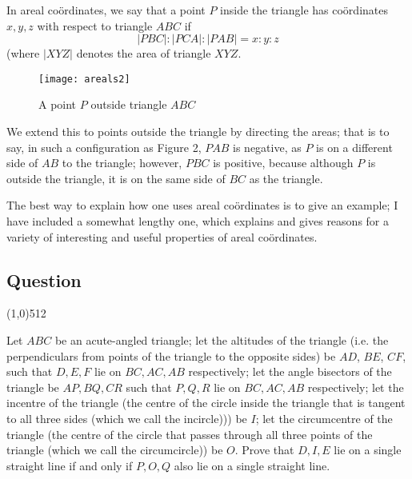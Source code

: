 \documentclass[11pt,a4paper]{report}
\let\origsection\subsection
\renewcommand{\subsection}[1]{\origsection{#1}\vspace{-0.5em}\line(1,0){512}\vspace{-1em}}
\newcounter{count}
\begin{document}
	\begin{multicols}{2}
		
		In areal coördinates, we say that a point \(P\) inside the triangle has coördinates \(x,y,z\) with respect to triangle \(ABC\) if \[|PBC|:|PCA|:|PAB|=x:y:z\]
		(where \(|XYZ|\) denotes the area of triangle \(XYZ\).
		
	\end{multicols}
	
	\setcounter{figure}{-1}
	
	\begin{figure}[h]
		\centering
		\texttt{[image: areals2]}
		\caption{A point \(P\) outside triangle \(ABC\)}
	\end{figure}
	
	\begin{multicols}{2}
		
		We extend this to points outside the triangle by directing the areas; that is to say, in such a configuration as Figure 2, \(PAB\) is negative, as \(P\) is on a different side of \(AB\) to the triangle; however, \(PBC\) is positive, because although \(P\) is outside the triangle, it is on the same side of \(BC\) as the triangle.
		
		The best way to explain how one uses areal coördinates is to give an example; I have included a somewhat lengthy one, which explains and gives reasons for a variety of interesting and useful properties of areal coördinates.
		
	\end{multicols}
	
	\subsection{Question}
	
	\begin{multicols}{2}
		
		Let \(ABC\) be an acute-angled triangle; let the altitudes of the triangle (i.e. the perpendiculars from points of the triangle to the opposite sides) be \(AD\), \(BE\), \(CF\), such that \(D, E, F\) lie on \(BC, AC, AB\) respectively; let the angle bisectors of the triangle be \(AP, BQ, CR\) such that \(P, Q, R\) lie on \(BC, AC, AB\) respectively; let the incentre of the triangle (the centre of the circle inside the triangle that is tangent to all three sides (which we call the incircle))) be \(I\); let the circumcentre of the triangle (the centre of the circle that passes through all three points of the triangle (which we call the circumcircle)) be \(O\). Prove that \(D, I, E\) lie on a single straight line if and only if \(P, O, Q\) also lie on a single straight line.
		
	\end{multicols}
	
\end{document}
